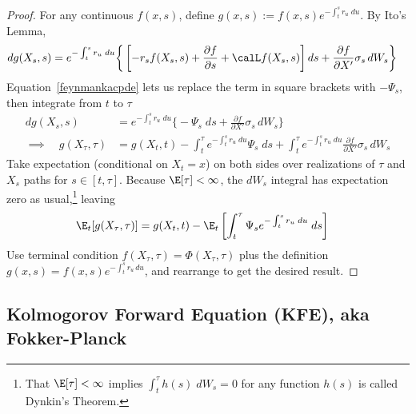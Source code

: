 \documentclass[12pt]{article}
\theoremstyle{plain}
\theoremstyle{definition}
\theoremstyle{remark}
\begin{document}
\begin{proof}
For any continuous $f(x,s)$, define
$g(x,s):=f(x,s)e^{-\int_t^sr_u\;du}$.
By Ito's Lemma,
\begin{align*}
  dg(X_s,s)
  &=
  e^{-\int_t^sr_u\;du}\bigg\{
  \left[
  -r_s f(X_s,s)
  + \frac{\partial f}{\partial s}
  + \calL f(X_s,s)
  \right]
  ds
  +
  \frac{\partial f}{\partial X'}
  \sigma_s
  \,dW_s
  \bigg\}
\end{align*}
Equation~\ref{feynmankacpde} lets us replace the term in square
brackets with $-\Psi_s$, then integrate from $t$ to $\tau$
\begin{align*}
  dg(X_s,s)
  &=
  e^{-\int_t^sr_u\;du}
  \bigg\{
  -
  \Psi_s
  \;
  ds
  +
  \frac{\partial f}{\partial X'}
  \sigma_s
  \,dW_s
  \bigg\}
  \\
  \implies\quad
  g(X_\tau,\tau)
  &=
  g(X_t,t)
  -
  \int_t^\tau
  e^{-\int_t^s r_u\;du}
  \Psi_s
  \;
  ds
  +
  \int_t^\tau
  e^{-\int_t^sr_u\;du}
  \frac{\partial f}{\partial X'}
  \sigma_s
  \,dW_s
\end{align*}
Take expectation (conditional on $X_t=x$) on both sides over
realizations of $\tau$ and $X_s$ paths for $s\in[t,\tau]$.
Because $\E[\tau]<\infty$, the $dW_s$ integral has expectation zero as
usual,\footnote{%
  That $\E[\tau]<\infty$ implies $\int_t^\tau h(s) \;dW_s=0$ for any
  function $h(s)$ is called Dynkin's Theorem.
}
leaving
\begin{align*}
  \E_t[g(X_{\tau},\tau)]
  &=
  g(X_t,t)
  -
  \E_t\left[
  \int_t^\tau
  \Psi_s
  e^{-\int_t^sr_u\;du}
  \;
  ds
  \right]
\end{align*}
Use terminal condition $f(X_\tau,\tau)=\Phi(X_\tau,\tau)$ plus the
definition $g(x,s)=f(x,s)e^{-\int_t^sr_u\,du}$, and rearrange to get the
desired result.
\end{proof}


\clearpage
\subsection{Kolmogorov Forward Equation (KFE), aka Fokker-Planck}
\end{document}
